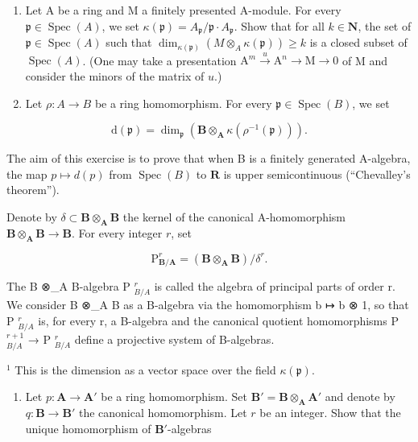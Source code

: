 \begin{enumerate}
\def\labelenumi{\arabic{enumi})}
\setcounter{enumi}{8}
\item
  Let A be a ring and M a finitely presented A-module. For every \(\mathfrak{p} \in \operatorname{Spec}(A)\), we set \(\kappa(\mathfrak{p}) = A_{\mathfrak{p}} / \mathfrak{p} \cdot A_{\mathfrak{p}}\). Show that for all \(k \in \mathbf{N}\), the set of \(\mathfrak{p} \in \operatorname{Spec}(A)\) such that \(\dim_{\kappa(\mathfrak{p})} (M \otimes_A \kappa(\mathfrak{p})) \geqslant k\) is a closed subset of \(\operatorname{Spec}(A)\). (One may take a presentation \(\mathrm{A}^m \xrightarrow{u} \mathrm{A}^n \longrightarrow \mathrm{M} \longrightarrow 0\) of M and consider the minors of the matrix of \(u\).)
\item
  Let \(\rho: A \to B\) be a ring homomorphism. For every \(\mathfrak{p} \in \operatorname{Spec}(B)\), we set
\end{enumerate}

\[
\mathrm{d} (\mathfrak {p}) = \dim_ {\mathfrak {p}} \left(\mathbf {B} \otimes_ {\mathbf {A}} \kappa \left(\rho^ {- 1} (\mathfrak {p})\right)\right).
\]

The aim of this exercise is to prove that when B is a finitely generated A-algebra, the map \(p \mapsto d(p)\) from \(\operatorname{Spec}(B)\) to \(\mathbf{R}\) is upper semicontinuous (“Chevalley’s theorem”).

Denote by \(\delta \subset \mathbf{B} \otimes_{\mathbf{A}} \mathbf{B}\) the kernel of the canonical A-homomorphism \(\mathbf{B} \otimes_{\mathbf{A}} \mathbf{B} \to \mathbf{B}\). For every integer \(r\), set

\[
\mathrm{P} _ {\mathbf {B} / \mathbf {A}} ^ {r} = (\mathbf {B} \otimes_ {\mathbf {A}} \mathbf {B}) / \delta^ {r}.
\]

The B ⊗\_A B-algebra P \(_{B/A}^{r}\) is called the algebra of principal parts of order r. We consider B ⊗\_A B as a B-algebra via the homomorphism b ↦ b ⊗ 1, so that P \(_{B/A}^{r}\) is, for every r, a B-algebra and the canonical quotient homomorphisms P \(_{B/A}^{r+1}\) → P \(_{B/A}^{r}\) define a projective system of B-algebras.

\(^{1}\) This is the dimension as a vector space over the field \(\kappa(\mathfrak{p})\).

\begin{enumerate}
\def\labelenumi{\alph{enumi})}
\tightlist
\item
  Let \(p: \mathbf{A} \to \mathbf{A}'\) be a ring homomorphism. Set \(\mathbf{B}' = \mathbf{B} \otimes_{\mathbf{A}} \mathbf{A}'\) and denote by \(q: \mathbf{B} \to \mathbf{B}'\) the canonical homomorphism. Let \(r\) be an integer. Show that the unique homomorphism of \(\mathbf{B}'\)-algebras
\end{enumerate}

